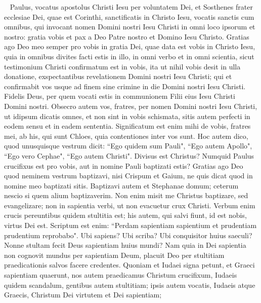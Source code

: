 
\begin{biblechapter}  
\verse Paulus, vocatus apostolus Christi Iesu per voluntatem Dei, et Sosthenes frater 
\verse ecclesiae Dei, quae est Corinthi, sanctificatis in Christo Iesu, vocatis sanctis cum omnibus, qui invocant nomen Domini nostri Iesu Christi in omni loco ipsorum et nostro: 
\verse gratia vobis et pax a Deo Patre nostro et Domino Iesu Christo. 
\verse Gratias ago Deo meo semper pro vobis in gratia Dei, quae data est vobis in Christo Iesu, 
\verse quia in omnibus divites facti estis in illo, in omni verbo et in omni scientia, 
\verse sicut testimonium Christi confirmatum est in vobis,  
\verse ita ut nihil vobis desit in ulla donatione, exspectantibus revelationem Domini nostri Iesu Christi; 
\verse qui et confirmabit vos usque ad finem sine crimine in die Domini nostri Iesu Christi. 
\verse Fidelis Deus, per quem vocati estis in communionem Filii eius Iesu Christi Domini nostri. 
\verse Obsecro autem vos, fratres, per nomen Domini nostri Iesu Christi, ut idipsum dicatis omnes, et non sint in vobis schismata, sitis autem perfecti in eodem sensu et in eadem sententia. 
\verse Significatum est enim mihi de vobis, fratres mei, ab his, qui sunt Chloes, quia contentiones inter vos sunt. 
\verse Hoc autem dico, quod unusquisque vestrum dicit: “Ego quidem sum Pauli", “Ego autem Apollo", “Ego vero Cephae", “Ego autem Christi". 
\verse Divisus est Christus? Numquid Paulus crucifixus est pro vobis, aut in nomine Pauli baptizati estis? 
\verse Gratias ago Deo quod neminem vestrum baptizavi, nisi Crispum et Gaium, 
\verse ne quis dicat quod in nomine meo baptizati sitis.  
\verse Baptizavi autem et Stephanae domum; ceterum nescio si quem alium baptizaverim. 
\verse Non enim misit me Christus baptizare, sed evangelizare; non in sapientia verbi, ut non evacuetur crux Christi. 
\verse Verbum enim crucis pereuntibus quidem stultitia est; his autem, qui salvi fiunt, id est nobis, virtus Dei est. 
\verse Scriptum est enim: “Perdam sapientiam sapientium et prudentiam prudentium reprobabo". 
\verse Ubi sapiens? Ubi scriba? Ubi conquisitor huius saeculi? Nonne stultam fecit Deus sapientiam huius mundi? 
\verse Nam quia in Dei sapientia non cognovit mundus per sapientiam Deum, placuit Deo per stultitiam praedicationis salvos facere credentes. 
\verse Quoniam et Iudaei signa petunt, et Graeci sapientiam quaerunt, 
\verse nos autem praedicamus Christum crucifixum, Iudaeis quidem scandalum, gentibus autem stultitiam; 
\verse ipsis autem vocatis, Iudaeis atque Graecis, Christum Dei virtutem et Dei sapientiam; 

\end{biblechapter}
